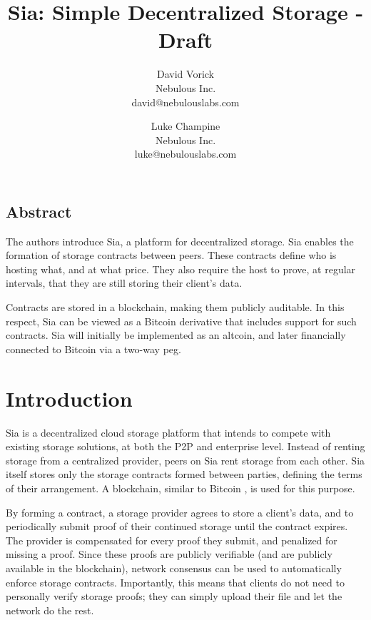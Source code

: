 \documentclass[twocolumn]{article}
\begin{document}
\frenchspacing

\title{Sia: Simple Decentralized Storage - Draft}

\author{
{\rm David Vorick}\\
Nebulous Inc.\\
david@nebulouslabs.com
\and
{\rm Luke Champine}\\
Nebulous Inc.\\
luke@nebulouslabs.com
}

\maketitle

\subsection*{Abstract}
The authors introduce Sia, a platform for decentralized storage.
Sia enables the formation of storage contracts between peers.
These contracts define who is hosting what, and at what price.
They also require the host to prove, at regular intervals, that they are still storing their client's data.

Contracts are stored in a blockchain, making them publicly auditable.
In this respect, Sia can be viewed as a Bitcoin derivative that includes support for such contracts.
Sia will initially be implemented as an altcoin, and later financially connected to Bitcoin via a two-way peg.

\section{Introduction}
Sia is a decentralized cloud storage platform that intends to compete with existing storage solutions, at both the P2P and enterprise level.
Instead of renting storage from a centralized provider, peers on Sia rent storage from each other.
Sia itself stores only the storage contracts formed between parties, defining the terms of their arrangement.
A blockchain, similar to Bitcoin \cite{btc, btcdg}, is used for this purpose.

By forming a contract, a storage provider agrees to store a client's data, and to periodically submit proof of their continued storage until the contract expires.
The provider is compensated for every proof they submit, and penalized for missing a proof.
Since these proofs are publicly verifiable (and are publicly available in the blockchain), network consensus can be used to automatically enforce storage contracts.
Importantly, this means that clients do not need to personally verify storage proofs; they can simply upload their file and let the network do the rest.
\end{document}
